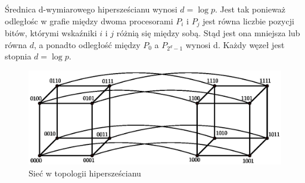 Średnica d-wymiarowego hipersześcianu wynosi \(d=\log{p}\). Jest tak ponieważ odległośc w grafie między dwoma procesorami \(P_i\) i \(P_j\) jest równa liczbie pozycji bitów, którymi wskaźniki \(i\) i \(j\) różnią się między sobą. Stąd jest ona mniejsza lub równa \(d\), a ponadto odległość między \(P_0\) a \(P_{2^d-1}\) wynosi d. Każdy węzeł jest stopnia \(d=\log{p}\).

\begin{figure}[h]
\centering
\includegraphics[width=36em]{./images/systolic.eps}
\caption{Sieć w topologii hipersześcianu}
\label{fig:systolic}
\end{figure}